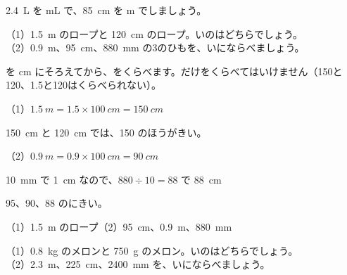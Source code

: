 \begin{jibun}
\qty{2.4}{L} を mL で、\qty{85}{cm} を m でしましょう。
\end{jibun}

\begin{reidai}[\R{単位}{たん|い}をそろえてくらべる]
（1）\qty{1.5}{m} のロープと \qty{120}{cm} のロープ。いのはどちらでしょう。\\
（2）\qty{0.9}{m}、\qty{95}{cm}、\qty{880}{mm} の3のひもを、いにならべましょう。\par
\kangaekata {}を cm にそろえてから、をくらべます。だけをくらべてはいけません（150と120、1.5と120はくらべられない）。\par
\begin{bkcenter}
\end{bkcenter}
\shiki （1）$\qty{1.5}{m}=1.5\times\qty{100}{cm}=\qty{150}{cm}$\par
\hspace*{4.6\zw}\qty{150}{cm} と \qty{120}{cm} では、150 のほうがきい。\par
\hspace*{2.6\zw}（2）$\qty{0.9}{m}=0.9\times\qty{100}{cm}=\qty{90}{cm}$\par
\hspace*{4.6\zw}\qty{10}{mm} で \qty{1}{cm} なので、$880\div10=88$ で \qty{88}{cm}\par
\hspace*{4.6\zw}95、90、88 のにきい。\par
\kotae （1）\qty{1.5}{m} のロープ\quad（2）\qty{95}{cm}、\qty{0.9}{m}、\qty{880}{mm}
\end{reidai}

\begin{jibun}
（1）\qty{0.8}{kg} のメロンと \qty{750}{g} のメロン。いのはどちらでしょう。\\
（2）\qty{2.3}{m}、\qty{225}{cm}、\qty{2400}{mm} を、いにならべましょう。
\end{jibun}

